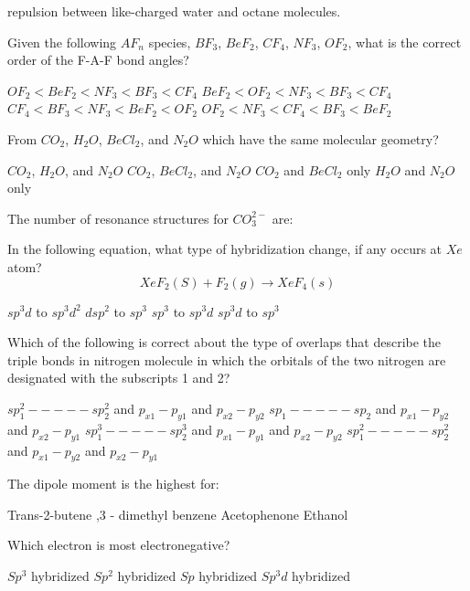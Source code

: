 \documentclass[12pt,addpoints]{exam}
\begin{document}
{{{\begin{questions}
\begin{choices}
			 			\choice repulsion between like-charged water and octane molecules.
			 		\end{choices}
		 			\question Given the following $AF_n$ species, $BF_3$, $BeF_2$, $CF_4$, $NF_3$, $OF_2$, what is the correct order of the F-A-F bond angles?
		 			\begin{choices}
		 				\choice $OF_2<BeF_2<NF_3<BF_3<CF_4$
		 				\choice $BeF_2<OF_2<NF_3<BF_3<CF_4$
		 				\choice $CF_4<BF_3<NF_3<BeF_2<OF_2$
		 				\choice $OF_2<NF_3<CF_4<BF_3<BeF_2$
		 			\end{choices}
	 				\question From $CO_2$, $H_2O$, $BeCl_2$, and $N_2O$ which have the same molecular geometry?
	 				\begin{choices}
	 					\choice $CO_2$, $H_2O$, and $N_2O$
	 					\choice $CO_2$, $BeCl_2$, and $N_2O$
	 					\choice $CO_2$ and $BeCl_2$ only
	 					\choice $H_2O$ and $N_2O$ only
	 				\end{choices}
 					\question The number of resonance structures for $CO_3^{2-}$ are: \\
 					\begin{oneparchoices}
 						\choice 9
 						\choice 2
 						\choice 3
 						\choice 6
 					\end{oneparchoices}
 					\question In the following equation, what type of hybridization change, if any occurs at $Xe$ atom?
 					$$XeF_2(S)+F_2(g)\rightarrow XeF_4(s)$$
 					\begin{oneparchoices}
 						\choice $sp^3d$ to $sp^3d^2$
 						\choice $dsp^2$ to $sp^3$
 						\choice $sp^3$ to $sp^3d$
 						\choice $sp^3d$ to $sp^3$
 					\end{oneparchoices}
 					\question Which of the following is correct about the type of overlaps that describe the triple bonds in nitrogen molecule in which the orbitals of the two nitrogen are designated with the subscripts 1 and 2?
 					\begin{choices}
 						\choice $sp^2_1-----sp^2_2$ and $p_{x1}-p_{y1}$ and $p_{x2}-p_{y2}$
 						\choice $sp_1-----sp_2$ and $p_{x1}-p_{y2}$ and $p_{x2}-p_{y1}$
 						\choice $sp^3_1-----sp^3_2$ and $p_{x1}-p_{y1}$ and $p_{x2}-p_{y2}$
 						\choice $sp^2_1-----sp^2_2$ and $p_{x1}-p_{y2}$ and $p_{x2}-p_{y1}$
 					\end{choices}
 					\question The dipole moment is the highest for: \\
 					\begin{oneparchoices}
 						\choice Trans-2-butene 
 						,3 - dimethyl benzene
 						\choice Acetophenone 
 						\choice Ethanol
 					\end{oneparchoices}
 					\question Which electron is most electronegative? \\
 					\begin{oneparchoices}
 						\choice $Sp^3$ hybridized
 						\choice $Sp^2$ hybridized
 						\choice $Sp$ hybridized
 						\choice $Sp^3d$ hybridized
 					\end{oneparchoices}

\end{questions}}}}
\end{document}
